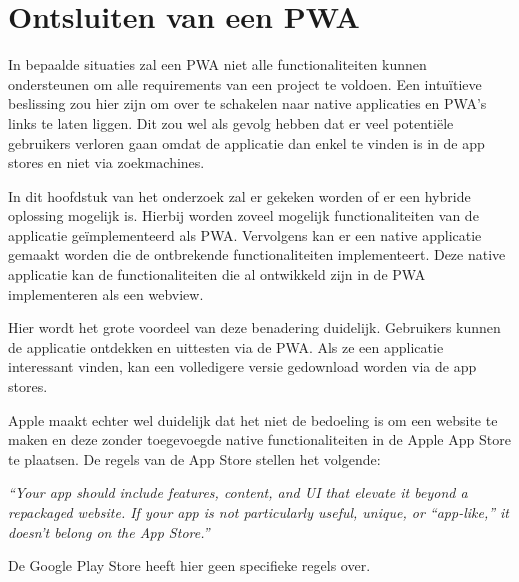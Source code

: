 \section{Ontsluiten van een PWA}
In bepaalde situaties zal een PWA niet alle functionaliteiten kunnen ondersteunen om alle requirements van een project te voldoen. Een intuïtieve beslissing zou hier zijn om over te schakelen naar native applicaties en PWA's links te laten liggen. Dit zou wel als gevolg hebben dat er veel potentiële gebruikers verloren gaan omdat de applicatie dan enkel te vinden is in de app stores en niet via zoekmachines.

In dit hoofdstuk van het onderzoek zal er gekeken worden of er een hybride oplossing mogelijk is. Hierbij worden zoveel mogelijk functionaliteiten van de applicatie geïmplementeerd als PWA. Vervolgens kan er een native applicatie gemaakt worden die de ontbrekende functionaliteiten implementeert. Deze native applicatie kan de functionaliteiten die al ontwikkeld zijn in de PWA implementeren als een webview. 

Hier wordt het grote voordeel van deze benadering duidelijk. Gebruikers kunnen de applicatie ontdekken en uittesten via de PWA. Als ze een applicatie interessant vinden, kan een volledigere versie gedownload worden via de app stores.

Apple maakt echter wel duidelijk dat het niet de bedoeling is om een website te maken en deze zonder toegevoegde native functionaliteiten in de Apple App Store te plaatsen. De regels van de App Store stellen het volgende:

\textit{“Your app should include features, content, and UI that elevate it beyond a repackaged website. If your app is not particularly useful, unique, or “app-like,” it doesn’t belong on the App Store.”}
\autocite{Apple2020c}


De Google Play Store heeft hier geen specifieke regels over.
\autocite{GooglePlay2020a}